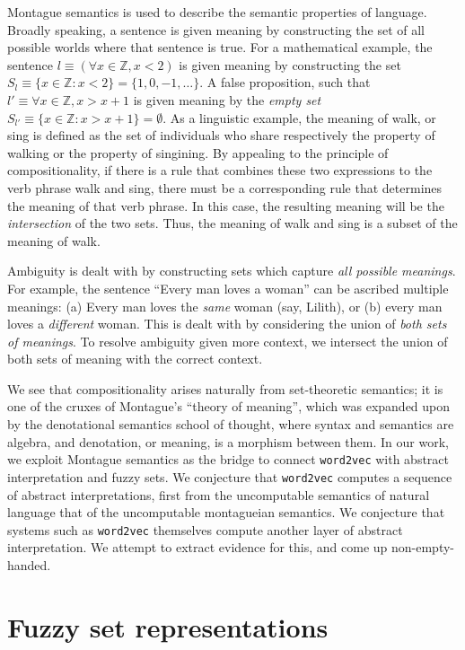 \documentclass[11pt]{book}
\newcommand{\Z}{\ensuremath{\mathbb Z}}
\begin{document}
Montague semantics is used to describe the semantic properties of language.
Broadly speaking, a sentence is given meaning by constructing the set of all
possible worlds where that sentence is true. For a mathematical example, the
sentence $l \equiv (\forall x \in \Z, x < 2)$ is given meaning by constructing
the set $S_l \equiv \{ x \in \Z : x < 2 \} = \{1, 0, -1, \dots \}$. A false
proposition, such that $l' \equiv \forall x \in \Z, x > x + 1$ is given meaning
by the \emph{empty set} $S_{l'} \equiv \{ x \in \Z: x > x + 1 \} = \emptyset$.
As a linguistic example, the meaning of walk, or sing is defined as the set of
individuals who share respectively the property of walking or the property of
singining.  By appealing to the principle of compositionality, if there is a
rule that combines these two expressions to the verb phrase walk and sing,
there must be a corresponding rule that determines the meaning of that verb
phrase. In this case, the resulting meaning will be the \emph{intersection} of
the two sets.  Thus, the meaning of walk and sing is a subset of the meaning of
walk.

Ambiguity is dealt with by constructing sets which capture \emph{all possible
meanings}.  For example, the sentence ``Every man loves a woman'' can be ascribed
multiple meanings: (a) Every man loves the \emph{same} woman (say, Lilith), or
(b) every man loves a \emph{different} woman. This is dealt with by considering
the union of \emph{both sets of meanings}. To resolve ambiguity given more
context, we intersect the union of both sets of meaning with the correct context.


We see that compositionality arises naturally from set-theoretic semantics; it
is one of the cruxes of Montague's ``theory of meaning'', which was expanded
upon by the denotational semantics school of thought, where syntax and
semantics are algebra, and denotation, or meaning, is a morphism between them.
In our work, we exploit Montague semantics as the bridge to connect \texttt{word2vec} with
abstract interpretation and fuzzy sets. We conjecture that \texttt{word2vec}
computes a sequence of abstract interpretations, first from the uncomputable
semantics of natural language that of the uncomputable montagueian semantics.
We conjecture that systems such as \texttt{word2vec} themselves compute another
layer of abstract interpretation. We attempt to extract evidence for this, and
come up non-empty-handed.


\chapter{Fuzzy set representations}
\label{chapter:fuzzy-set-representation}
\end{document}

